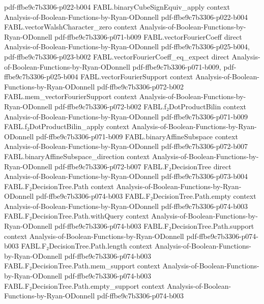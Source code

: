 \begin{theorem}
  {pdf-ffbe9c7b3306-p022-b004}
\proofstep
  {FABL.binaryCubeSignEquiv_apply}
  {context}
  {Analysis-of-Boolean-Functions-by-Ryan-ODonnell}
  {pdf-ffbe9c7b3306-p022-b004}
\proofstep
  {FABL.vectorWalshCharacter_zero}
  {context}
  {Analysis-of-Boolean-Functions-by-Ryan-ODonnell}
  {pdf-ffbe9c7b3306-p071-b009}
\proofstep
  {FABL.vectorFourierCoeff}
  {direct}
  {Analysis-of-Boolean-Functions-by-Ryan-ODonnell}
  {pdf-ffbe9c7b3306-p025-b004,
    pdf-ffbe9c7b3306-p023-b002}
\proofstep
  {FABL.vectorFourierCoeff_eq_expect}
  {direct}
  {Analysis-of-Boolean-Functions-by-Ryan-ODonnell}
  {pdf-ffbe9c7b3306-p071-b009,
    pdf-ffbe9c7b3306-p025-b004}
\proofstep
  {FABL.vectorFourierSupport}
  {context}
  {Analysis-of-Boolean-Functions-by-Ryan-ODonnell}
  {pdf-ffbe9c7b3306-p072-b002}
\proofstep
  {FABL.mem_vectorFourierSupport}
  {context}
  {Analysis-of-Boolean-Functions-by-Ryan-ODonnell}
  {pdf-ffbe9c7b3306-p072-b002}
\proofstep
  {FABL.f₂DotProductBilin}
  {context}
  {Analysis-of-Boolean-Functions-by-Ryan-ODonnell}
  {pdf-ffbe9c7b3306-p071-b009}
\proofstep
  {FABL.f₂DotProductBilin_apply}
  {context}
  {Analysis-of-Boolean-Functions-by-Ryan-ODonnell}
  {pdf-ffbe9c7b3306-p071-b009}
\proofstep
  {FABL.binaryAffineSubspace}
  {context}
  {Analysis-of-Boolean-Functions-by-Ryan-ODonnell}
  {pdf-ffbe9c7b3306-p072-b007}
\proofstep
  {FABL.binaryAffineSubspace_direction}
  {context}
  {Analysis-of-Boolean-Functions-by-Ryan-ODonnell}
  {pdf-ffbe9c7b3306-p072-b007}
\proofstep
  {FABL.F₂DecisionTree}
  {direct}
  {Analysis-of-Boolean-Functions-by-Ryan-ODonnell}
  {pdf-ffbe9c7b3306-p073-b004}
\proofstep
  {FABL.F₂DecisionTree.Path}
  {context}
  {Analysis-of-Boolean-Functions-by-Ryan-ODonnell}
  {pdf-ffbe9c7b3306-p074-b003}
\proofstep
  {FABL.F₂DecisionTree.Path.empty}
  {context}
  {Analysis-of-Boolean-Functions-by-Ryan-ODonnell}
  {pdf-ffbe9c7b3306-p074-b003}
\proofstep
  {FABL.F₂DecisionTree.Path.withQuery}
  {context}
  {Analysis-of-Boolean-Functions-by-Ryan-ODonnell}
  {pdf-ffbe9c7b3306-p074-b003}
\proofstep
  {FABL.F₂DecisionTree.Path.support}
  {context}
  {Analysis-of-Boolean-Functions-by-Ryan-ODonnell}
  {pdf-ffbe9c7b3306-p074-b003}
\proofstep
  {FABL.F₂DecisionTree.Path.length}
  {context}
  {Analysis-of-Boolean-Functions-by-Ryan-ODonnell}
  {pdf-ffbe9c7b3306-p074-b003}
\proofstep
  {FABL.F₂DecisionTree.Path.mem_support}
  {context}
  {Analysis-of-Boolean-Functions-by-Ryan-ODonnell}
  {pdf-ffbe9c7b3306-p074-b003}
\proofstep
  {FABL.F₂DecisionTree.Path.empty_support}
  {context}
  {Analysis-of-Boolean-Functions-by-Ryan-ODonnell}
  {pdf-ffbe9c7b3306-p074-b003}
\proofstep

\end{theorem}
